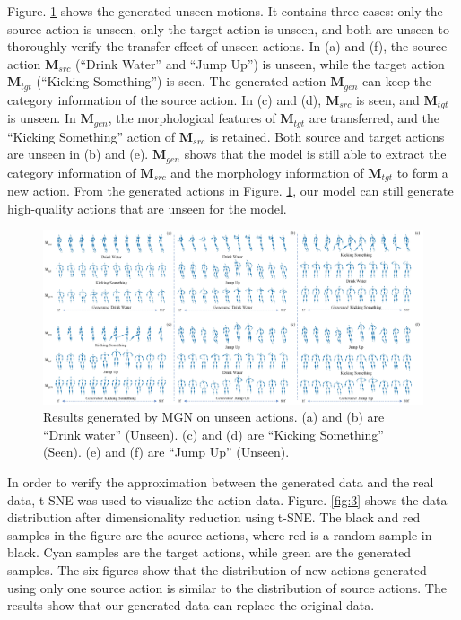Figure. \ref{fig:5} shows the generated unseen motions. 
It contains three cases: only the source action is unseen, only the target action is unseen, and both are unseen to thoroughly verify the transfer effect of unseen actions. 
In (a) and (f), the source action $\textbf{M}_{src}$  (“Drink Water” and “Jump Up”) is unseen, while the target action $\textbf{M}_{tgt}$  (“Kicking Something”) is seen. The generated action $\textbf{M}_{gen}$ can keep the category information of the source action. 
In (c) and (d), $\textbf{M}_{src}$  is seen, and $\textbf{M}_{tgt}$ is unseen. In $\textbf{M}_{gen}$, the morphological features of $\textbf{M}_{tgt}$ are transferred, and the “Kicking Something” action of $\textbf{M}_{src}$ is retained. 
Both source and target actions are unseen in (b) and (e). $\textbf{M}_{gen}$ shows that the model is still able to extract the category information of $\textbf{M}_{src}$ and the morphology information of $\textbf{M}_{tgt}$ to form a new action.
From the generated actions in Figure. \ref{fig:5}, our model can still generate high-quality actions that are unseen for the model.

\begin{figure}[htpb]
  \centering
   \includegraphics[width=\linewidth]{figures/Fig5.jpg}

   \caption{Results generated by MGN on unseen actions. (a) and (b) are  “Drink water” (Unseen). (c) and (d) are “Kicking Something” (Seen). (e) and (f) are “Jump Up” (Unseen).}
   \label{fig:5}
\end{figure}

In order to verify the approximation between the generated data and the real data, t-SNE was used to visualize the action data. 
Figure. \ref{fig:3} shows the data distribution after dimensionality reduction using t-SNE. The black and red samples in the figure are the source actions, where red is a random sample in black. Cyan samples are the target actions, while green are the generated samples. The six figures show that the distribution of new actions generated using only one source action is similar to the distribution of source actions. The results show that our generated data can replace the original data. 

